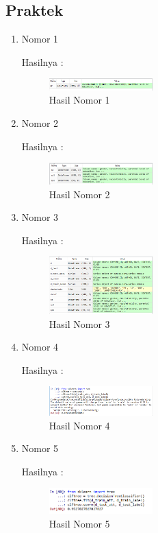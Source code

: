 \subsection{Praktek}
\begin{enumerate}
\item Nomor 1

Hasilnya :
\hfill\break
	\begin{figure}[H]
		\includegraphics[width=4cm]{figures/1174054/4/6.png}
		\centering
		\caption{Hasil Nomor 1}
	\end{figure}
	
\item Nomor 2
\hfill\break
	
Hasilnya :
\hfill\break
	\begin{figure}[H]
		\includegraphics[width=4cm]{figures/1174054/4/7.png}
		\centering
		\caption{Hasil Nomor 2}
	\end{figure}
	
\item Nomor 3
\hfill\break
	
Hasilnya :
\hfill\break
	\begin{figure}[H]
		\includegraphics[width=4cm]{figures/1174054/4/8.png}
		\centering
		\caption{Hasil Nomor 3}
	\end{figure}
	
\item Nomor 4
\hfill\break
	
Hasilnya :
\hfill\break
	\begin{figure}[H]
		\includegraphics[width=4cm]{figures/1174054/4/9.png}
		\centering
		\caption{Hasil Nomor 4}
	\end{figure}	

\item Nomor 5
\hfill\break
	
Hasilnya :
\hfill\break
	\begin{figure}[H]
		\includegraphics[width=4cm]{figures/1174054/4/10.png}
		\centering
		\caption{Hasil Nomor 5}
	\end{figure}
	

\end{enumerate}
